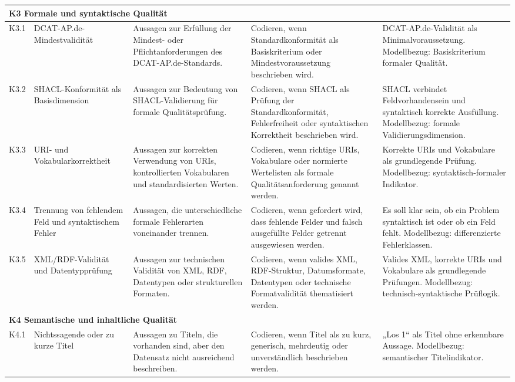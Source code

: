 \begin{longtable}{p{1cm} p{2.5cm} p{3.2cm} p{4.5cm} p{4.5cm}}
\midrule
\multicolumn{5}{l}{\textbf{K3 Formale und syntaktische Qualität}} \\
\midrule

K3.1 & DCAT-AP.de-Mindestvalidität
& Aussagen zur Erfüllung der Mindest- oder Pflichtanforderungen des DCAT-AP.de-Standards.
& Codieren, wenn Standardkonformität als Basiskriterium oder Mindestvoraussetzung beschrieben wird.
& DCAT-AP.de-Validität als Minimalvoraussetzung. Modellbezug: Basiskriterium formaler Qualität. \\

K3.2 & SHACL-Konformität als Basisdimension
& Aussagen zur Bedeutung von SHACL-Validierung für formale Qualitätsprüfung.
& Codieren, wenn SHACL als Prüfung der Standardkonformität, Fehlerfreiheit oder syntaktischen Korrektheit beschrieben wird.
& SHACL verbindet Feldvorhandensein und syntaktisch korrekte Ausfüllung. Modellbezug: formale Validierungsdimension. \\

K3.3 & URI- und Vokabularkorrektheit
& Aussagen zur korrekten Verwendung von URIs, kontrollierten Vokabularen und standardisierten Werten.
& Codieren, wenn richtige URIs, Vokabulare oder normierte Wertelisten als formale Qualitätsanforderung genannt werden.
& Korrekte URIs und Vokabulare als grundlegende Prüfung. Modellbezug: syntaktisch-formaler Indikator. \\

K3.4 & Trennung von fehlendem Feld und syntaktischem Fehler
& Aussagen, die unterschiedliche formale Fehlerarten voneinander trennen.
& Codieren, wenn gefordert wird, dass fehlende Felder und falsch ausgefüllte Felder getrennt ausgewiesen werden.
& Es soll klar sein, ob ein Problem syntaktisch ist oder ob ein Feld fehlt. Modellbezug: differenzierte Fehlerklassen. \\

K3.5 & XML/RDF-Validität und Datentypprüfung
& Aussagen zur technischen Validität von XML, RDF, Datentypen oder strukturellen Formaten.
& Codieren, wenn valides XML, RDF-Struktur, Datumsformate, Datentypen oder technische Formatvalidität thematisiert werden.
& Valides XML, korrekte URIs und Vokabulare als grundlegende Prüfungen. Modellbezug: technisch-syntaktische Prüflogik. \\

\midrule
\multicolumn{5}{l}{\textbf{K4 Semantische und inhaltliche Qualität}} \\
\midrule

K4.1 & Nichtssagende oder zu kurze Titel
& Aussagen zu Titeln, die vorhanden sind, aber den Datensatz nicht ausreichend beschreiben.
& Codieren, wenn Titel als zu kurz, generisch, mehrdeutig oder unverständlich beschrieben werden.
& „Los 1“ als Titel ohne erkennbare Aussage. Modellbezug: semantischer Titelindikator. \\


\end{longtable}
